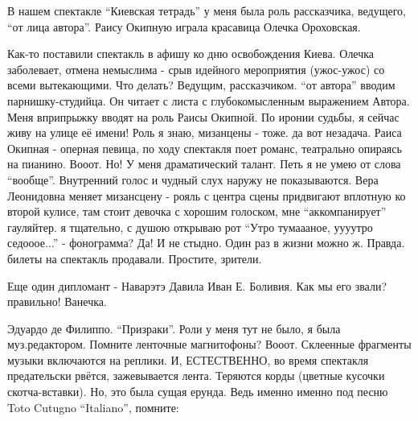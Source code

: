 
В нашем спектакле \enquote{Киевская тетрадь} у меня была роль рассказчика, ведущего,
\enquote{от лица автора}. Раису Окипную играла красавица Олечка Ороховская.

Как-то поставили спектакль в афишу ко дню освобождения Киева. Олечка
заболевает, отмена немыслима - срыв идейного мероприятия (ужос-ужос) со всеми
вытекающими. Что делать? Ведущим, рассказчиком. \enquote{от автора} вводим
парнишку-студийца. Он читает с листа с глубокомысленным выражением Автора. Меня
вприпрыжку вводят на роль Раисы Окипной. По иронии судьбы, я сейчас живу на
улице её имени! Роль я знаю, мизанцены - тоже. да вот незадача. Раиса Окипная -
оперная певица, по ходу спектакля поет романс, театрально опираясь на пианино.
Вооот. Но! У меня драматический талант. Петь я не умею от слова \enquote{вообще}.
Внутренний голос и чудный слух наружу не показываются. Вера Леонидовна меняет
мизансцену - рояль с центра сцены придвигают вплотную ко второй кулисе, там
стоит девочка с хорошим голоском, мне \enquote{аккомпанирует} гауляйтер. я тщательно, с
душою открываю рот \enquote{Утро тумаааное, уууутро седооое...} - фонограмма? Да! И не
стыдно. Один раз в жизни можно ж. Правда. билеты на спектакль продавали.
Простите, зрители.

\raggedcolumns
\begin{multicols}{3} %
\setlength{\parindent}{0pt}





\end{multicols} %

Еще один дипломант - Наварэтэ Давила Иван Е. Боливия. Как мы его звали?
правильно! Ванечка. 

Эдуардо де Филиппо. \enquote{Призраки}. Роли у меня тут не было, я была муз.редактором.
Помните ленточные магнитофоны? Вооот. Склеенные фрагменты музыки включаются на
реплики. И, ЕСТЕСТВЕННО, во время спектакля предательски рвётся, зажевывается
лента. Теряются корды (цветные кусочки скотча-вставки). Но, это была сущая
ерунда. Ведь именно именно под песню  Toto Cutugno \enquote{Italiano}, помните:

